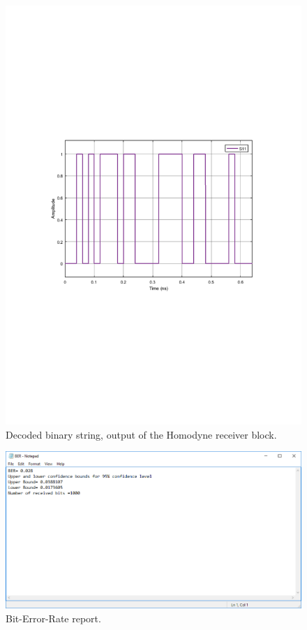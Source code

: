 \documentclass[a4paper]{article}
\begin{document}
\begin{figure}[H]
\centering
\includegraphics[width=\linewidth, trim= 0mm 95mm 0mm 95mm, clip]{decodedbinarystring.pdf}
\caption{Decoded binary string, output of the Homodyne receiver block.}
\label{fig:decoded}
\end{figure}

\begin{figure}[H]
\centering
\includegraphics[width=\linewidth]{berreport.png}
\caption{Bit-Error-Rate report.}
\label{fig:ber}
\end{figure}
\end{document}

